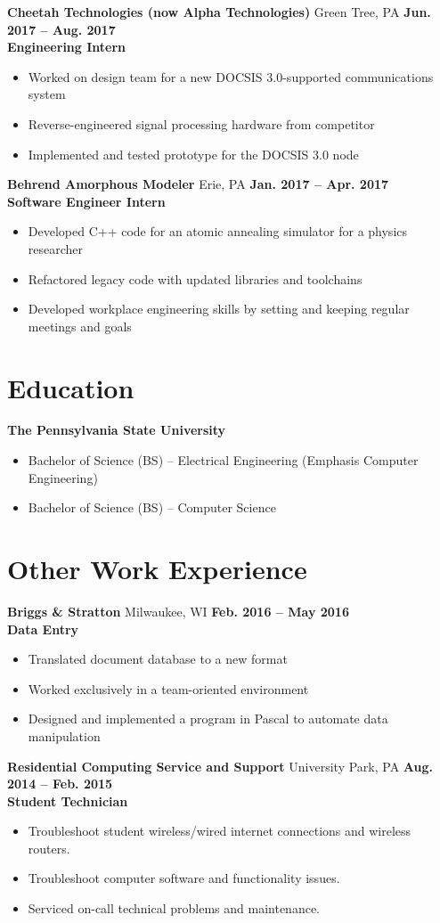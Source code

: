 \documentclass[letterpaper,10pt]{article}
\begin{document}
\textbf{Cheetah Technologies (now Alpha Technologies)} Green Tree, PA \hfill \textbf{Jun. 2017 -- Aug. 2017}\\
\textbf{Engineering Intern}
\begin{itemize}
\item Worked on design team for a new DOCSIS 3.0-supported communications system
\item Reverse-engineered signal processing hardware from competitor
\item Implemented and tested prototype for the DOCSIS 3.0 node
\end{itemize}
\textbf{Behrend Amorphous Modeler} Erie, PA \hfill \textbf{Jan. 2017 -- Apr. 2017}\\
\textbf{Software Engineer Intern}
\begin{itemize}
\item Developed C++ code for an atomic annealing simulator for a physics researcher
\item Refactored legacy code with updated libraries and toolchains
\item Developed workplace engineering skills by setting and keeping regular meetings and goals
\end{itemize}

\section{Education}
\textbf{The Pennsylvania State University}
\begin{itemize}
\item Bachelor of Science (BS) -- Electrical Engineering (Emphasis Computer Engineering)
\item Bachelor of Science (BS) -- Computer Science
\end{itemize}

\section{Other Work Experience}
\textbf{Briggs \& Stratton} Milwaukee, WI \hfill \textbf{Feb. 2016 -- May 2016}\\
\textbf{Data Entry}
\begin{itemize}
\item Translated document database to a new format
\item Worked exclusively in a team-oriented environment
\item Designed and implemented a program in Pascal to automate data manipulation
\end{itemize}
\textbf{Residential Computing Service and Support} University Park, PA \hfill \textbf{Aug. 2014 – Feb. 2015}\\
\textbf{Student Technician}
\begin{itemize}
\item Troubleshoot student wireless/wired internet connections and wireless routers.
\item Troubleshoot computer software and functionality issues.
\item Serviced on-call technical problems and maintenance.
\end{itemize}
\end{document}
